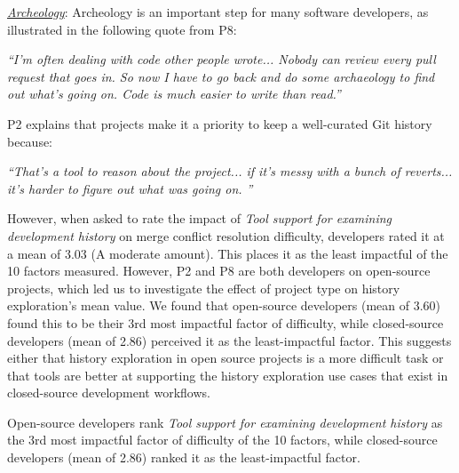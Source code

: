 \underline{\textit{Archeology}}:
Archeology is an important step for many software developers, as illustrated in the following quote from P8:
\begin{displayquote}
\textit{``I'm often dealing with code other people wrote... Nobody can review every pull request that goes in. So now I have to go back and do some archaeology to find out what's going on. Code is much easier to write than read.''}
\end{displayquote}
P2 explains that projects make it a priority to keep a well-curated Git history because:
\begin{displayquote}
\textit{``That's a tool to reason about the project... if it's messy with a bunch of reverts... it's harder to figure out what was going on.	''}
\end{displayquote}

However, when asked to rate the impact of \textit{Tool support for examining development history} on merge conflict resolution difficulty, developers rated it at a mean of 3.03 (A moderate amount). This places it as the least impactful of the 10 factors measured. However, P2 and P8 are both developers on open-source projects, which led us to investigate the effect of project type on history exploration's mean value. We found that open-source developers (mean of 3.60) found this to be their 3rd most impactful factor of difficulty, while closed-source developers (mean of 2.86) perceived it as the least-impactful factor. This suggests either that history exploration in open source projects is a more difficult task or that tools are better at supporting the history exploration use cases that exist in closed-source development workflows.

\begin{tcolorbox}[enhanced,minipage boxed title,enhanced,title={Takeaway \arabic{takeawaycounter}},
attach boxed title to top left=
{xshift=0mm,yshift=-1mm},
boxed title style={size=small}]
Open-source developers rank \textit{Tool support for examining development history} as the 3rd most impactful factor of difficulty of the 10 factors, while closed-source developers (mean of 2.86) ranked it as the least-impactful factor.
\end{tcolorbox}
\addtocounter{takeawaycounter}{1}

